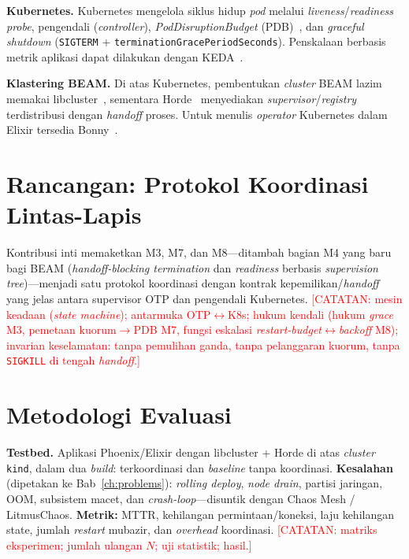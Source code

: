 \documentclass[11pt,a4paper]{report}
\newcommand{\todo}[1]{\textcolor{red}{[CATATAN: #1]}}
\begin{document}
\noindent\textbf{Kubernetes.} Kubernetes mengelola siklus hidup \emph{pod} melalui
\emph{liveness}/\emph{readiness probe}, pengendali (\emph{controller}),
\emph{PodDisruptionBudget} (PDB)~\cite{k8sPDB}, dan \emph{graceful shutdown}
(\texttt{SIGTERM} + \texttt{terminationGracePeriodSeconds}). Penskalaan berbasis metrik
aplikasi dapat dilakukan dengan KEDA~\cite{keda}.

\noindent\textbf{Klastering BEAM.} Di atas Kubernetes, pembentukan \emph{cluster} BEAM
lazim memakai libcluster~\cite{libcluster}, sementara Horde~\cite{horde} menyediakan
\emph{supervisor}/\emph{registry} terdistribusi dengan \emph{handoff} proses. Untuk
menulis \emph{operator} Kubernetes dalam Elixir tersedia Bonny~\cite{bonny}.







\chapter{Rancangan: Protokol Koordinasi Lintas-Lapis}
\label{ch:design}
Kontribusi inti memaketkan M3, M7, dan M8---ditambah bagian M4 yang baru bagi BEAM
(\emph{handoff-blocking termination} dan \emph{readiness} berbasis \emph{supervision
tree})---menjadi satu protokol koordinasi dengan kontrak kepemilikan/\emph{handoff} yang
jelas antara supervisor OTP dan pengendali Kubernetes.
\todo{mesin keadaan (\emph{state machine}); antarmuka OTP$\leftrightarrow$K8s; hukum
kendali (hukum \emph{grace} M3, pemetaan kuorum$\rightarrow$PDB M7, fungsi eskalasi
\emph{restart-budget}$\leftrightarrow$\emph{backoff} M8); invarian keselamatan: tanpa
pemulihan ganda, tanpa pelanggaran kuorum, tanpa \texttt{SIGKILL} di tengah \emph{handoff}.}

\chapter{Metodologi Evaluasi}
\label{ch:eval}
\textbf{Testbed.} Aplikasi Phoenix/Elixir dengan libcluster + Horde di atas \emph{cluster}
\texttt{kind}, dalam dua \emph{build}: terkoordinasi dan \emph{baseline} tanpa koordinasi.
\textbf{Kesalahan} (dipetakan ke Bab~\ref{ch:problems}): \emph{rolling deploy},
\emph{node drain}, partisi jaringan, OOM, subsistem macet, dan \emph{crash-loop}---disuntik
dengan Chaos Mesh / LitmusChaos. \textbf{Metrik:} MTTR, kehilangan permintaan/koneksi,
laju kehilangan state, jumlah \emph{restart} mubazir, dan \emph{overhead} koordinasi.
\todo{matriks eksperimen; jumlah ulangan $N$; uji statistik; hasil.}
\end{document}
